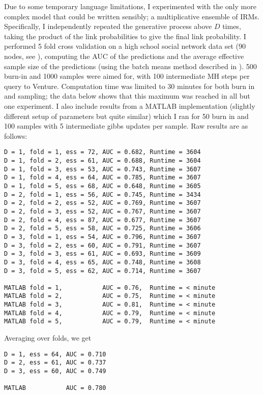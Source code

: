 \documentclass[twoside,11pt]{article}
\begin{document}
Due to some temporary language limitations, I experimented with the only more complex model that could be written sensibly; a multiplicative ensemble of IRMs.
Specifically, I independently repeated the generative process above $D$ times, taking the product of the link probabilities to give the final link probability.
I performed 5 fold cross validation on a high school social network data set (90 nodes, see \eg \cite{Hoff2007a}), computing the AUC of the predictions and the average effective sample size of the predictions (using the batch means method described in \cite{thompson2010comparison}).
500 burn-in and 1000 samples were aimed for, with 100 intermediate MH steps per query to Venture.
Computation time was limited to 30 minutes for both burn in and sampling; the data below shows that this maximum was reached in all but one experiment.
I also include results from a MATLAB implementation (slightly different setup of parameters but quite similar) which I ran for 50 burn in and 100 samples with 5 intermediate gibbs updates per sample.
Raw results are as follows:
%
\begin{lstlisting}
D = 1, fold = 1, ess = 72, AUC = 0.682, Runtime = 3604
D = 1, fold = 2, ess = 61, AUC = 0.688, Runtime = 3604
D = 1, fold = 3, ess = 53, AUC = 0.743, Runtime = 3607
D = 1, fold = 4, ess = 64, AUC = 0.785, Runtime = 3607
D = 1, fold = 5, ess = 68, AUC = 0.648, Runtime = 3605
D = 2, fold = 1, ess = 56, AUC = 0.745, Runtime = 3434
D = 2, fold = 2, ess = 52, AUC = 0.769, Runtime = 3607
D = 2, fold = 3, ess = 52, AUC = 0.767, Runtime = 3607
D = 2, fold = 4, ess = 87, AUC = 0.677, Runtime = 3607
D = 2, fold = 5, ess = 58, AUC = 0.725, Runtime = 3606
D = 3, fold = 1, ess = 54, AUC = 0.796, Runtime = 3607
D = 3, fold = 2, ess = 60, AUC = 0.791, Runtime = 3607
D = 3, fold = 3, ess = 61, AUC = 0.693, Runtime = 3609
D = 3, fold = 4, ess = 65, AUC = 0.748, Runtime = 3608
D = 3, fold = 5, ess = 62, AUC = 0.714, Runtime = 3607

MATLAB fold = 1,           AUC = 0.76,  Runtime = < minute
MATLAB fold = 2,           AUC = 0.75,  Runtime = < minute
MATLAB fold = 3,           AUC = 0.81,  Runtime = < minute
MATLAB fold = 4,           AUC = 0.79,  Runtime = < minute
MATLAB fold = 5,           AUC = 0.79,  Runtime = < minute
\end{lstlisting}
%
Averaging over folds, we get
%
\begin{lstlisting}
D = 1, ess = 64, AUC = 0.710
D = 2, ess = 61, AUC = 0.737
D = 3, ess = 60, AUC = 0.749

MATLAB           AUC = 0.780
\end{lstlisting}
%
\end{document}
